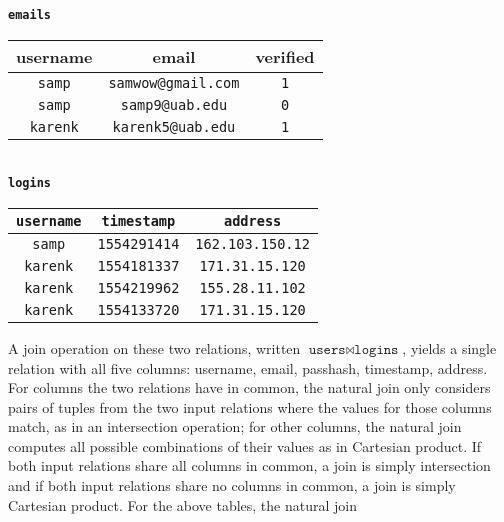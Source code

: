 \begin{center}
  \textbf{\texttt{emails}} \vspace{0.05cm} \\
  \begin{tabular}{ | c | c | c | }
    \hline
    \textbf{username} & \textbf{email} & \textbf{verified} \\
    \hline
    \texttt{samp} & \texttt{samwow@gmail.com} & \texttt{1} \\ \hline
    \texttt{samp} & \texttt{samp9@uab.edu} & \texttt{0} \\ \hline
    \texttt{karenk} & \texttt{karenk5@uab.edu} & \texttt{1} \\ \hline
  \end{tabular}
  \vspace{0.3cm} \\
  \textbf{\texttt{logins}} \vspace{0.05cm} \\
  \begin{tabular}{ | c | c | c | }
    \hline
    \textbf{\texttt{username}} & \textbf{\texttt{timestamp}} & \textbf{\texttt{address}} \\
    \hline
    \texttt{samp} & \texttt{1554291414} & \texttt{162.103.150.12} \\ \hline
    \texttt{karenk} & \texttt{1554181337} & \texttt{171.31.15.120} \\ \hline
    \texttt{karenk} & \texttt{1554219962} & \texttt{155.28.11.102} \\ \hline
    \texttt{karenk} & \texttt{1554133720} & \texttt{171.31.15.120} \\ \hline
  \end{tabular}
\end{center}

A join operation on these two relations, written $\texttt{users} \bowtie \texttt{logins}$,
yields a single relation with all five columns: username, email, passhash, timestamp, address. For columns the two relations have in common, the natural join only considers pairs of tuples from the two input relations where the values for those columns match, as in an intersection operation; for other columns, the natural join computes all possible combinations of their values as in Cartesian product. If both input relations share all columns in common, a join is simply intersection and if both input relations share no columns in common, a join is simply Cartesian product. For the above tables, the natural join

